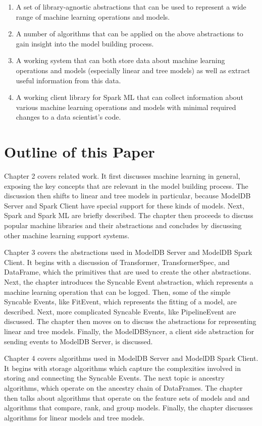 \begin{enumerate}
  \item A set of library-agnostic abstractions that can be used to
    represent a wide range of machine learning operations and models.
  \item A number of algorithms that can be applied on the above abstractions
    to gain insight into the model building process.
  \item A working system that can both store data about 
    machine learning operations and models (especially linear and tree models) 
    as well as extract useful information from this data.
  \item A working client library for Spark ML that can collect information 
    about various  machine learning operations and models with 
    minimal required changes to a data scientist's code.
\end{enumerate}


\section{Outline of this Paper}

Chapter 2 covers related work. It first discusses machine learning in general,
exposing the key concepts that are relevant in the model building process. The
discussion then shifts to linear and tree models in particular, because ModelDB
Server and Spark Client have special support for these kinds of models. Next, Spark
and Spark ML are briefly described. The chapter then proceeds to discuss popular
machine libraries and their abstractions and concludes by discussing other machine
learning support systems.

Chapter 3 covers the abstractions used in ModelDB Server and ModelDB Spark Client.
It begins with a discussion of Transformer, TransformerSpec, and DataFrame, which 
the primitives that are used to create the other abstractions. Next, the chapter
introduces the Syncable Event abstraction, which represents a machine learning
operation that can be logged. Then, some of the simple Syncable Events, like FitEvent,
which represents the fitting of a model, are described. Next, more complicated Syncable
Events, like PipelineEvent are discussed. The chapter then moves on to discuss the
abstractions for representing linear and tree models. Finally, the ModelDBSyncer,
a client side abstraction for sending events to ModelDB Server, is discussed.

Chapter 4 covers algorithms used in ModelDB Server and ModelDB Spark Client. It 
begins with storage algorithms which capture the complexities involved in storing
and connecting the Syncable Events. The next topic is ancestry algorithms, which
operate on the ancestry chain of DataFrames. The chapter then talks about algorithms
that operate on the feature sets of models and and algorithms that compare, rank,
and group models. Finally, the chapter discusses algorithms for linear models
and tree models.

